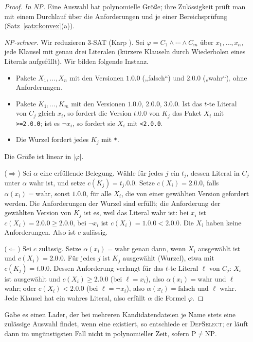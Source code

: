 \begin{proof}
	\emph{In NP.} Eine Auswahl hat polynomielle Größe; ihre Zulässigkeit prüft man mit einem Durchlauf über die Anforderungen und je einer Bereichsprüfung (Satz~\ref{satz:konvex}(a)).

	\emph{NP-schwer.} Wir reduzieren 3-SAT (Karp \cite{karp1972}). Sei $\varphi=C_1\wedge\cdots\wedge C_m$ über $x_1,\ldots,x_n$, jede Klausel mit genau drei Literalen (kürzere Klauseln durch Wiederholen eines Literals aufgefüllt). Wir bilden folgende Instanz.
	\begin{itemize}
		\item Pakete $X_1,\ldots,X_n$ mit den Versionen $1.0.0$ („falsch“) und $2.0.0$ („wahr“), ohne Anforderungen.
		\item Pakete $K_1,\ldots,K_m$ mit den Versionen $1.0.0$, $2.0.0$, $3.0.0$. Ist das $t$-te Literal von $C_j$ gleich $x_i$, so fordert die Version $t.0.0$ von $K_j$ das Paket $X_i$ mit \texttt{>=2.0.0}; ist es $\neg x_i$, so fordert sie $X_i$ mit \texttt{<2.0.0}.
		\item Die Wurzel fordert jedes $K_j$ mit \texttt{*}.
	\end{itemize}
	Die Größe ist linear in $|\varphi|$.

	($\Rightarrow$) Sei $\alpha$ eine erfüllende Belegung. Wähle für jedes $j$ ein $t_j$, dessen Literal in $C_j$ unter $\alpha$ wahr ist, und setze $c(K_j)=t_j.0.0$. Setze $c(X_i)=2.0.0$, falls $\alpha(x_i)=\mathrm{wahr}$, sonst $1.0.0$, für alle $X_i$, die von einer gewählten Version gefordert werden. Die Anforderungen der Wurzel sind erfüllt; die Anforderung der gewählten Version von $K_j$ ist es, weil das Literal wahr ist: bei $x_i$ ist $c(X_i)=2.0.0\ge2.0.0$, bei $\neg x_i$ ist $c(X_i)=1.0.0<2.0.0$. Die $X_i$ haben keine Anforderungen. Also ist $c$ zulässig.

	($\Leftarrow$) Sei $c$ zulässig. Setze $\alpha(x_i)=\mathrm{wahr}$ genau dann, wenn $X_i$ ausgewählt ist und $c(X_i)=2.0.0$. Für jedes $j$ ist $K_j$ ausgewählt (Wurzel), etwa mit $c(K_j)=t.0.0$. Dessen Anforderung verlangt für das $t$-te Literal $\ell$ von $C_j$: $X_i$ ist ausgewählt und $c(X_i)\ge2.0.0$ (bei $\ell=x_i$), also $\alpha(x_i)=\mathrm{wahr}$ und $\ell$ wahr; oder $c(X_i)<2.0.0$ (bei $\ell=\neg x_i$), also $\alpha(x_i)=\mathrm{falsch}$ und $\ell$ wahr. Jede Klausel hat ein wahres Literal, also erfüllt $\alpha$ die Formel $\varphi$.
\end{proof}

\begin{korollar}
	\label{kor:eindeutig}
	Gäbe es einen Lader, der bei mehreren Kandidatendateien je Name stets eine zulässige Auswahl findet, wenn eine existiert, so entschiede er \textsc{DepSelect}; er läuft dann im ungünstigsten Fall nicht in polynomieller Zeit, sofern $\mathrm{P}\ne\mathrm{NP}$.
\end{korollar}

